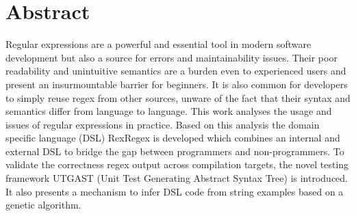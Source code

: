 \section*{Abstract}

Regular expressions are a powerful and essential tool in modern software development but also a source for errors and maintainability issues. Their poor readability and unintuitive semantics are a burden even to experienced users and present an insurmountable barrier for beginners. It is also common for developers to simply reuse regex from other sources, unware of the fact that their syntax and semantics differ from language to language. This work analyses the usage and issues of regular expressions in practice. Based on this analysis the domain specific language (DSL) RexRegex is developed which combines an internal and external DSL to bridge the gap between programmers and non-programmers. To validate the correctness regex output across compilation targets, the novel testing framework UTGAST (Unit Test Generating Abstract Syntax Tree) is introduced. It also presents a mechanism to infer DSL code from string examples based on a genetic algorithm.
